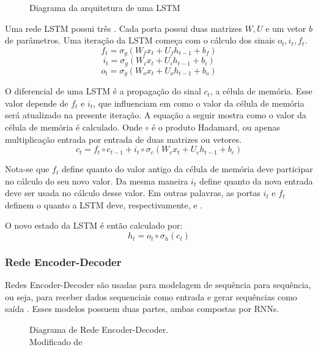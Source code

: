\begin{figure}
\centering
\caption{Diagrama da arquitetura de uma LSTM}

\label{fig:lstm}
\end{figure}




Uma rede LSTM possui três . Cada porta possui duas matrizes $W,U$ e um
vetor $b$ de parâmetros. Uma iteração da LSTM começa com o cálculo dos sinais
$o_t,i_t,f_t$.\\

\[f_t = \sigma_g(W_fx_t + U_fh_{t-1} + b_f)\]
\[i_t = \sigma_g(W_ix_t + U_ih_{t-1} + b_i)\]
\[o_t = \sigma_g(W_ox_t + U_oh_{t-1} + b_o)\]

O diferencial de uma LSTM é a propagação do sinal $c_t$, a célula de memória.
Esse valor depende de $f_t$ e $i_t$, que influenciam em como o valor da
célula de memória será atualizado na presente iteração. A equação a seguir
mostra como o valor da célula de memória é calculado. Onde $\circ$ é o produto Hadamard, ou apenas multiplicação entrada por entrada de
duas matrizes ou vetores. \\

\[c_t = f_t \circ c_{t-1} + i_t \circ \sigma_c(W_cx_t + U_ch_{t-1} + b_c)\]

Nota-se que $f_t$
define quanto do valor antigo da célula de memória deve participar no cálculo do
seu novo valor. 
Da mesma maneira $i_t$ define quanto da nova entrada deve ser usada no cálculo desse valor.
Em outras palavras, as portas $i_t$ e $f_t$ definem o quanto a LSTM deve,
respectivamente,  e .


O novo estado da LSTM é então calculado por: \\
\[h_t = o_t \circ \sigma_h(c_t)\]




\subsubsection{Rede Encoder-Decoder}
\label{sec:encdec}
Redes Encoder-Decoder são usadas para modelagem de sequência para
sequência, ou seja, para receber dados sequenciais como entrada e gerar
sequências como saída \citep{dlbook}. Esses modelos possuem duas partes, ambas compostas por
RNNs. \\

\begin{figure}[H]
\centering

\caption{ Diagrama de Rede Encoder-Decoder.\\ Modificado de \citep{encdec}}

\end{figure}
  
